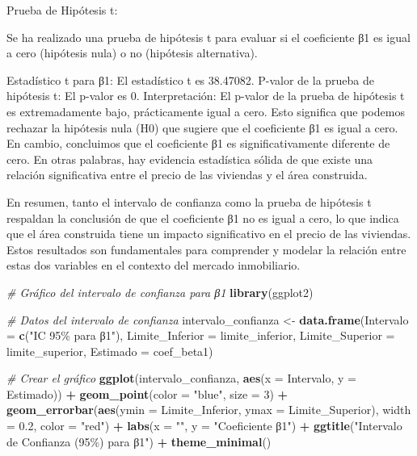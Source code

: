 \documentclass[
]{article}
\newenvironment{Shaded}{\begin{snugshade}}{\end{snugshade}}
\newcommand{\AttributeTok}[1]{\textcolor[rgb]{0.13,0.29,0.53}{#1}}
\newcommand{\CommentTok}[1]{\textcolor[rgb]{0.56,0.35,0.01}{\textit{#1}}}
\newcommand{\DecValTok}[1]{\textcolor[rgb]{0.00,0.00,0.81}{#1}}
\newcommand{\FloatTok}[1]{\textcolor[rgb]{0.00,0.00,0.81}{#1}}
\newcommand{\FunctionTok}[1]{\textcolor[rgb]{0.13,0.29,0.53}{\textbf{#1}}}
\newcommand{\NormalTok}[1]{#1}
\newcommand{\OtherTok}[1]{\textcolor[rgb]{0.56,0.35,0.01}{#1}}
\newcommand{\SpecialCharTok}[1]{\textcolor[rgb]{0.81,0.36,0.00}{\textbf{#1}}}
\newcommand{\StringTok}[1]{\textcolor[rgb]{0.31,0.60,0.02}{#1}}
\begin{document}
Prueba de Hipótesis t:

Se ha realizado una prueba de hipótesis t para evaluar si el coeficiente
β1 es igual a cero (hipótesis nula) o no (hipótesis alternativa).

Estadístico t para β1: El estadístico t es 38.47082. P-valor de la
prueba de hipótesis t: El p-valor es 0. Interpretación: El p-valor de la
prueba de hipótesis t es extremadamente bajo, prácticamente igual a
cero. Esto significa que podemos rechazar la hipótesis nula (H0) que
sugiere que el coeficiente β1 es igual a cero. En cambio, concluimos que
el coeficiente β1 es significativamente diferente de cero. En otras
palabras, hay evidencia estadística sólida de que existe una relación
significativa entre el precio de las viviendas y el área construida.

En resumen, tanto el intervalo de confianza como la prueba de hipótesis
t respaldan la conclusión de que el coeficiente β1 no es igual a cero,
lo que indica que el área construida tiene un impacto significativo en
el precio de las viviendas. Estos resultados son fundamentales para
comprender y modelar la relación entre estas dos variables en el
contexto del mercado inmobiliario.

\begin{Shaded}
\begin{Highlighting}[]
\CommentTok{\# Gráfico del intervalo de confianza para β1}
\FunctionTok{library}\NormalTok{(ggplot2)}

\CommentTok{\# Datos del intervalo de confianza}
\NormalTok{intervalo\_confianza }\OtherTok{\textless{}{-}} \FunctionTok{data.frame}\NormalTok{(}\AttributeTok{Intervalo =} \FunctionTok{c}\NormalTok{(}\StringTok{"IC 95\% para β1"}\NormalTok{), }
                                  \AttributeTok{Limite\_Inferior =}\NormalTok{ limite\_inferior, }
                                  \AttributeTok{Limite\_Superior =}\NormalTok{ limite\_superior,}
                                  \AttributeTok{Estimado =}\NormalTok{ coef\_beta1)}

\CommentTok{\# Crear el gráfico}
\FunctionTok{ggplot}\NormalTok{(intervalo\_confianza, }\FunctionTok{aes}\NormalTok{(}\AttributeTok{x =}\NormalTok{ Intervalo, }\AttributeTok{y =}\NormalTok{ Estimado)) }\SpecialCharTok{+}
  \FunctionTok{geom\_point}\NormalTok{(}\AttributeTok{color =} \StringTok{"blue"}\NormalTok{, }\AttributeTok{size =} \DecValTok{3}\NormalTok{) }\SpecialCharTok{+}
  \FunctionTok{geom\_errorbar}\NormalTok{(}\FunctionTok{aes}\NormalTok{(}\AttributeTok{ymin =}\NormalTok{ Limite\_Inferior, }\AttributeTok{ymax =}\NormalTok{ Limite\_Superior), }\AttributeTok{width =} \FloatTok{0.2}\NormalTok{, }\AttributeTok{color =} \StringTok{"red"}\NormalTok{) }\SpecialCharTok{+}
  \FunctionTok{labs}\NormalTok{(}\AttributeTok{x =} \StringTok{""}\NormalTok{, }\AttributeTok{y =} \StringTok{"Coeficiente β1"}\NormalTok{) }\SpecialCharTok{+}
  \FunctionTok{ggtitle}\NormalTok{(}\StringTok{"Intervalo de Confianza (95\%) para β1"}\NormalTok{) }\SpecialCharTok{+}
  \FunctionTok{theme\_minimal}\NormalTok{()}
\end{Highlighting}
\end{Shaded}
\end{document}
